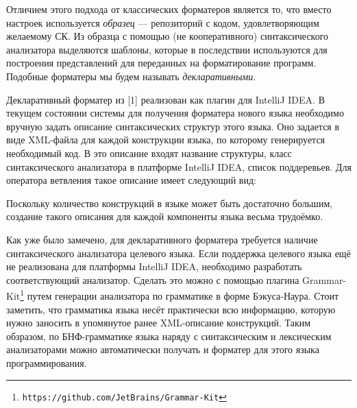 \documentclass[conference]{IEEEtran}
\begin{document}
Отличием этого подхода от классических форматеров является то, что вместо
настроек используется \emph{образец} --- репозиторий с кодом, 
удовлетворяющим желаемому СК. Из образца с помощью (не кооперативного)
синтаксического анализатора выделяются шаблоны, которые в последствии
используются для построения представлений для переданных на форматирование
программ.
Подобные форматеры мы будем называть \emph{декларативными}.


Декларативный форматер из [1] %
реализован как плагин для
IntelliJ IDEA. В текущем состоянии системы для 
получения форматера нового языка необходимо вручную задать описание
синтаксических структур этого языка.
Оно задается в виде XML-файла для каждой конструкции языка,
по которому генерируется необходимый код.
В это описание входят название структуры, класс синтаксического анализатора
в платформе IntelliJ IDEA, список поддеревьев.
Для оператора ветвления такое описание имеет следующий вид:



\noindent
Поскольку количество конструкций в языке может быть достаточно большим,
создание такого описания для каждой компоненты языка весьма трудоёмко.


Как уже было замечено, для декларативного форматера требуется наличие
синтаксического анализатора целевого языка.
Если поддержка целевого языка ещё не реализована для платформы
IntelliJ IDEA, необходимо разработать соответствующий анализатор.
Сделать это можно с помощью плагина
Grammar-Kit\footnote{\texttt{https://github.com/JetBrains/Grammar-Kit}}
путем генерации анализатора по грамматике в форме Бэкуса-Наура.
Стоит заметить, что грамматика языка несёт практически всю информацию,
которую нужно заносить в упомянутое ранее XML-описание конструкций.
Таким обзразом, по БНФ-грамматике языка наряду с синтаксическим и
лексическим анализаторами можно автоматически получать и форматер
для этого языка программирования.
\end{document}
